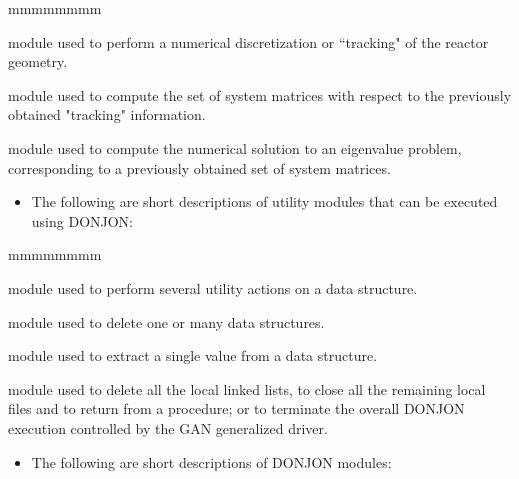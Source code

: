 \vskip 0.2cm
\begin{ListeDeDescription}{mmmmmmmm}

\item[\moc{TRIVAT:}] module used to perform a 
numerical discretization or ``tracking" of the reactor geometry.

\item[\moc{TRIVAA:}] module used to compute the set of system
matrices with respect to the previously obtained "tracking" information.

\item[\moc{FLUD:}] module used to compute the numerical solution
to an eigenvalue problem, corresponding to a previously obtained
set of system matrices.

\end{ListeDeDescription}

\vskip 0.2cm
\begin{itemize}
\item  The following are short descriptions of utility modules that
can be executed using DONJON:
\end{itemize}

\vskip 0.2cm
\begin{ListeDeDescription}{mmmmmmmm}

\item[\moc{UTL:}] module used to perform several utility actions
on a data structure.

\item[\moc{DELETE:}] module used to delete one or many data structures.

\item[\moc{GREP:}] module used to extract a single value from a data structure.

\item[\moc{END:}] module used to delete all the local linked lists, to close
all the remaining local files and to return from a procedure; or to terminate
the overall DONJON execution controlled by the GAN generalized driver.

\end{ListeDeDescription}

\vskip 0.2cm
\begin{itemize}
\item  The following are short descriptions of DONJON modules:
\end{itemize}

